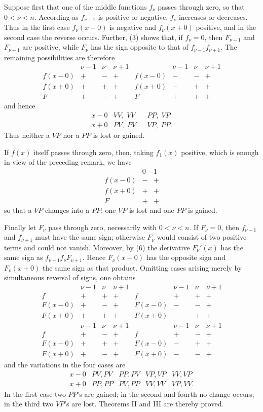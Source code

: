 \documentclass[11pt]{article}
\begin{document}
Suppose first that one of the middle functions $f_\nu$ passes through zero, so that $0<\nu<n$. According as $f_{\nu+1}$ is positive or negative, $f_\nu$ increases or decreases. Thus in the first case $f_\nu(x-0)$ is negative and $f_\nu(x+0)$ positive, and in the second case the reverse occurs. Further, (3) shows that, if $f_\nu=0$, then $F_{\nu-1}$ and $F_{\nu+1}$ are positive, while $F_\nu$ has the sign opposite to that of $f_{\nu-1}f_{\nu+1}$. The remaining possibilities are therefore
\[
\begin{array}{c|ccc||c|ccc}
 &\nu-1&\nu&\nu+1& &\nu-1&\nu&\nu+1\\ \hline
f(x-0)&+&-&+& f(x-0)&-&-&+\\
f(x+0)&+&+&+& f(x+0)&-&+&+\\ \hline
F&+&-&+&F&+&+&+
\end{array}
\]
and hence
\[
\begin{array}{c|cc|cc}
x-0&VV,\;VV& &PP,\;VP\\
x+0&PV,\;PV& &VP,\;PP.
\end{array}
\]
Thus neither a $VP$ nor a $PP$ is lost or gained.

If $f(x)$ itself passes through zero, then, taking $f_1(x)$ positive, which is enough in view of the preceding remark, we have
\[
\begin{array}{c|cc}
&0&1\\ \hline
f(x-0)&-&+\\
f(x+0)&+&+\\ \hline
F&+&+
\end{array}
\]
so that a $VP$ changes into a $PP$: one $VP$ is lost and one $PP$ is gained.

Finally let $F_\nu$ pass through zero, necessarily with $0<\nu<n$. If $F_\nu=0$, then $f_{\nu-1}$ and $f_{\nu+1}$ must have the same sign; otherwise $F_\nu$ would consist of two positive terms and could not vanish. Moreover, by (6) the derivative $F_\nu'(x)$ has the same sign as $f_{\nu-1}f_\nu F_{\nu+1}$. Hence $F_\nu(x-0)$ has the opposite sign and $F_\nu(x+0)$ the same sign as that product. Omitting cases arising merely by simultaneous reversal of signs, one obtains
\[
\begin{array}{c|ccc||c|ccc}
 &\nu-1&\nu&\nu+1& &\nu-1&\nu&\nu+1\\ \hline
f&+&+&+&f&+&+&+\\
F(x-0)&+&-&+&F(x-0)&-&-&+\\
F(x+0)&+&+&+&F(x+0)&-&+&+
\end{array}
\]
\[
\begin{array}{c|ccc||c|ccc}
 &\nu-1&\nu&\nu+1& &\nu-1&\nu&\nu+1\\ \hline
f&+&-&+&f&+&-&+\\
F(x-0)&+&+&+&F(x-0)&-&+&+\\
F(x+0)&+&-&+&F(x+0)&-&-&+
\end{array}
\]
and the variations in the four cases are
\[
\begin{array}{c|cccc}
x-0&PV,PV&PP,PV&VP,VP&VV,VP\\
x+0&PP,PP&PV,PP&VV,VV&VP,VV.
\end{array}
\]
In the first case two $PP$'s are gained; in the second and fourth no change occurs; in the third two $VP$'s are lost. Theorems II and III are thereby proved.
\end{document}
